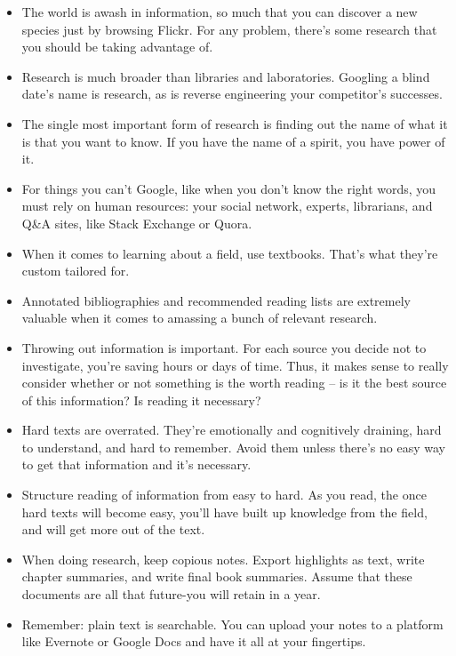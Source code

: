 \begin{itemize}
\item The world is awash in information, so much that you can discover a new species
just by browsing Flickr. For any problem, there's some research that you should
be taking advantage of.

\item Research is much broader than libraries and laboratories. Googling a blind
date's name is research, as is reverse engineering your competitor's successes.

\item The single most important form of research is finding out the name of what it
is that you want to know. If you have the name of a spirit, you have power of
it.

\item For things you can't Google, like when you don't know the right words, you
must rely on human resources: your social network, experts, librarians, and Q\&A
sites, like Stack Exchange or Quora.

\item When it comes to learning about a field, use textbooks. That's what they're
custom tailored for.

\item Annotated bibliographies and recommended reading lists are extremely valuable
when it comes to amassing a bunch of relevant research.

\item Throwing out information is important. For each source you decide not to
investigate, you're saving hours or days of time. Thus, it makes sense to really
consider whether or not something is the worth reading -- is it the best source
of this information? Is reading it necessary?

\item Hard texts are overrated. They're emotionally and cognitively draining, hard to
understand, and hard to remember. Avoid them unless there's no easy way to get
that information and it's necessary.

\item Structure reading of information from easy to hard. As you read, the once hard
texts will become easy, you'll have built up knowledge from the field, and will
get more out of the text.

\item When doing research, keep copious notes. Export highlights as text, write
chapter summaries, and write final book summaries. Assume that these documents
are all that future-you will retain in a year.

\item Remember: plain text is searchable. You can upload your notes to a platform
like Evernote or Google Docs and have it all at your fingertips.
\end{itemize}

